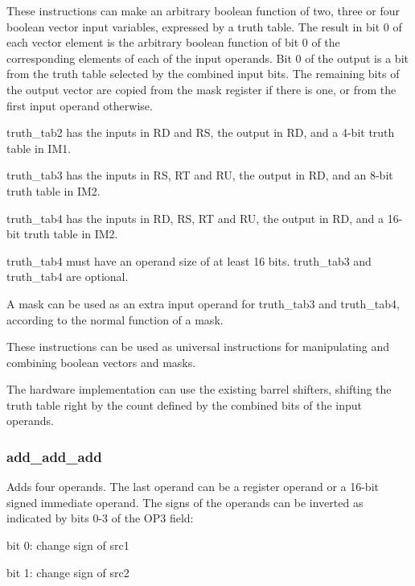 \documentclass[forwardcom.tex]{subfiles}
\begin{document}
These instructions can make an arbitrary boolean function of two, three or four boolean vector input variables, expressed by a truth table. The result in bit 0 of each vector element is the arbitrary boolean function of bit 0 of the corresponding elements of each of the input operands. Bit 0 of the output is a bit from the truth table selected by the combined input bits. The remaining bits of the output vector are copied from the mask register if there is one, or from the first input operand otherwise. 
\vspace{2mm}

truth\_tab2 has the inputs in RD and RS, the output in RD, and a 4-bit truth table in IM1.
\vspace{2mm}

truth\_tab3 has the inputs in RS, RT and RU, the output in RD, and an 8-bit truth table in IM2.
\vspace{2mm}

truth\_tab4 has the inputs in RD, RS, RT and RU, the output in RD, and a 16-bit truth table in IM2.
\vspace{2mm}

truth\_tab4 must have an operand size of at least 16 bits. truth\_tab3 and truth\_tab4 are optional.
\vspace{2mm}

A mask can be used as an extra input operand for truth\_tab3 and truth\_tab4, according to the normal function of a mask.
\vspace{2mm}

These instructions can be used as universal instructions for manipulating and combining boolean vectors and masks.
\vspace{2mm}

The hardware implementation can use the existing barrel shifters, shifting the truth table right by the count defined by the combined bits of the input operands.


\subsubsection{add\_add\_add} \label{addAddAdd}
Adds four operands. The last operand can be a register operand or a 16-bit signed immediate operand. The signs of the operands can be inverted as indicated by bits 0-3 of the OP3 field:
\vspace{2mm}

bit 0: change sign of src1

bit 1: change sign of src2
\end{document}
